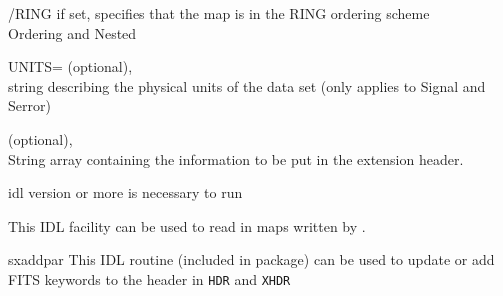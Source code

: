 \begin{keywords}
\begin{kwlist}{}
	\item[{/RING}] if set, specifies that the map is in the RING ordering
	scheme\\
	\seealso Ordering and Nested

	\item[{UNITS=}]
		(optional), \\
		string describing the physical units of the data set (only applies
		to Signal and Serror)

    	\item[XHDR\mytarget{idl:write_fits_cut4:XHDR}%
=] 	
		(optional), \\
		String array containing the information to be put in
		the extension header. 

   \end{kwlist}
\end{keywords}

\begin{codedescription}

\end{codedescription}



\begin{related}
  \begin{sulist}{} %
  \item[idl] version \idlversion or more is necessary to run \thedocid
  \item[\htmlref{read\_fits\_cut4}{idl:read_fits_cut4}] This \healpix IDL facility can be used to read in maps
  written by \thedocid.

  \item[sxaddpar] This IDL routine (included in \healpix package) can be used to update
  or add FITS keywords to the header in {\tt HDR} and {\tt XHDR}
  \end{sulist}
\end{related}


